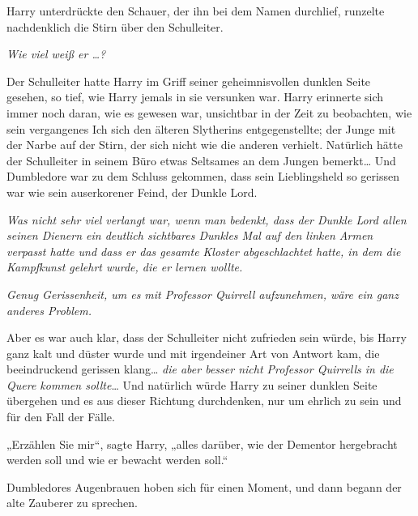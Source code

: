 {Harry unterdrückte den Schauer, der ihn bei dem Namen durchlief, runzelte nachdenklich die Stirn über den Schulleiter.

\emph{Wie viel weiß er …?}

Der Schulleiter hatte Harry im Griff seiner geheimnisvollen dunklen Seite gesehen, so tief, wie Harry jemals in sie versunken war. Harry erinnerte sich immer noch daran, wie es gewesen war, unsichtbar in der Zeit zu beobachten, wie sein vergangenes Ich sich den älteren Slytherins entgegenstellte; der Junge mit der Narbe auf der Stirn, der sich nicht wie die anderen verhielt. Natürlich hätte der Schulleiter in seinem Büro etwas Seltsames an dem Jungen bemerkt… Und Dumbledore war zu dem Schluss gekommen, dass sein Lieblingsheld so gerissen war wie sein auserkorener Feind, der Dunkle Lord.

\emph{Was nicht sehr viel verlangt war, wenn man bedenkt, dass der Dunkle Lord allen seinen Dienern ein deutlich sichtbares Dunkles Mal auf den linken Armen verpasst hatte und dass er das gesamte Kloster abgeschlachtet hatte, in dem die Kampfkunst gelehrt wurde, die er lernen wollte.}

\emph{Genug Gerissenheit, um es mit Professor Quirrell aufzunehmen, wäre ein ganz anderes Problem.}

Aber es war auch klar, dass der Schulleiter nicht zufrieden sein würde, bis Harry ganz kalt und düster wurde und mit irgendeiner Art von Antwort kam, die beeindruckend gerissen klang… \emph{die aber besser nicht Professor Quirrells in die Quere kommen sollte}… Und natürlich würde Harry zu seiner dunklen Seite übergehen und es aus dieser Richtung durchdenken, nur um ehrlich zu sein und für den Fall der Fälle.

„Erzählen Sie mir“, sagte Harry, „alles darüber, wie der Dementor hergebracht werden soll und wie er bewacht werden soll.“

Dumbledores Augenbrauen hoben sich für einen Moment, und dann begann der alte Zauberer zu sprechen.

}
